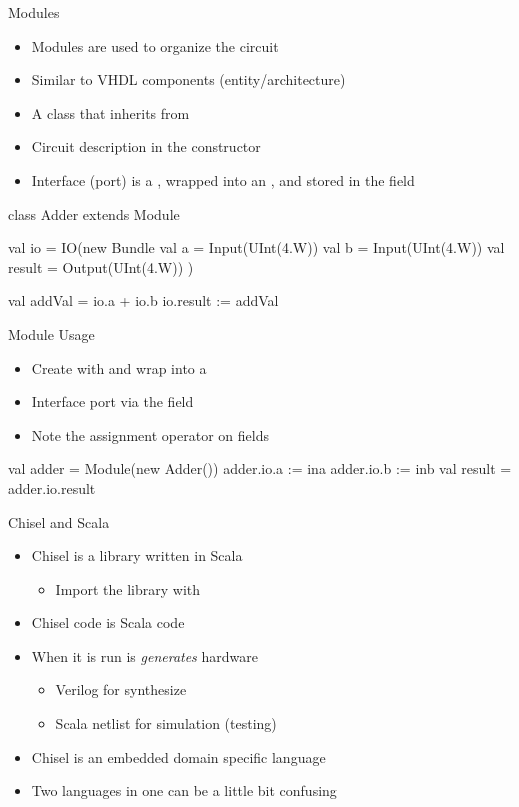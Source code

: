 \begin{frame}[fragile]{Modules}
\begin{itemize}
\item Modules are used to organize the circuit
\item Similar to VHDL components (entity/architecture)
\item A class that inherits from 
\item Circuit description in the constructor
\item Interface (port) is a , wrapped into an , and stored in the field 
\end{itemize}
\begin{chisel}
class Adder extends Module {
  val io = IO(new Bundle {
    val a = Input(UInt(4.W))
    val b = Input(UInt(4.W))
    val result = Output(UInt(4.W))
  })

  val addVal = io.a + io.b
  io.result := addVal
}
\end{chisel}
\end{frame}

\begin{frame}[fragile]{Module Usage}
\begin{itemize}
\item Create with  and wrap into a 
\item Interface port via the  field
\item Note the assignment operator \code{:=} on  fields
\end{itemize}
\begin{chisel}
  val adder = Module(new Adder())
  adder.io.a := ina
  adder.io.b := inb
  val result = adder.io.result
\end{chisel}
\end{frame}


\begin{frame}[fragile]{Chisel and Scala}
\begin{itemize}
\item Chisel is a library written in Scala
\begin{itemize}
\item Import the library with 
\end{itemize}
\item Chisel code is Scala code
\item When it is run is \emph{generates} hardware
\begin{itemize}
\item Verilog for synthesize
\item Scala netlist for simulation (testing)
\end{itemize}
\item Chisel is an embedded domain specific language
\item Two languages in one can be a little bit confusing
\end{itemize}
\end{frame}

